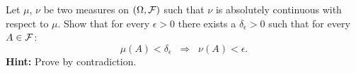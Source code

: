 \begin{problem}
	Let $\mu$, $\nu$ be two measures on $(\Omega, \mathcal F)$ such that $\nu$ is absolutely continuous with respect to $\mu$. Show that for every $\epsilon > 0$ there exists a $\delta_\epsilon > 0$ such that for every $A \in \mathcal F$:
	\[
		\mu(A) < \delta_\epsilon\;\;\Longrightarrow\;\; \nu(A) < \epsilon.
	\]
	\textbf{Hint:} Prove by contradiction.
\end{problem}

